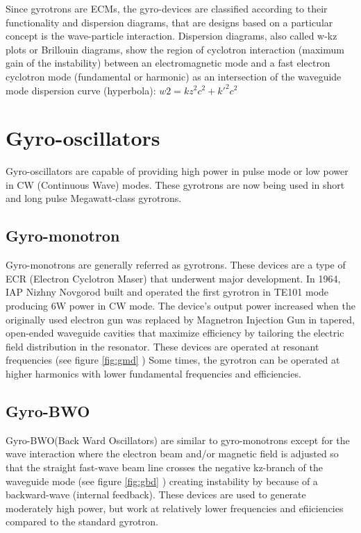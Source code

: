 Since gyrotrons are ECMs, the gyro-devices are classified according to their functionality and dispersion diagrams, that are designs based on a particular concept is the wave-particle interaction. Dispersion diagrams, also called w-kz plots or Brillouin diagrams, show the region of cyclotron interaction (maximum gain of the instability) between an electromagnetic mode and a fast electron cyclotron mode (fundamental or harmonic) as an intersection of the waveguide mode dispersion curve (hyperbola): $ w2 = k z^2 c^2 + k'^2 c^2 $

\section{Gyro-oscillators}
Gyro-oscillators are capable of providing high power in pulse mode or low power in CW (Continuous Wave) modes.  These gyrotrons are now being used in short and long pulse Megawatt-class gyrotrons.
\subsection{Gyro-monotron}
Gyro-monotrons are generally referred as gyrotrons. These devices are a type of ECR (Electron Cyclotron Maser) that underwent major development.  In 1964, IAP Nizhny Novgorod built and operated the first gyrotron in TE101 mode producing 6W power in CW mode. The device's output power increased when the originally used electron gun was replaced by Magnetron Injection Gun in tapered, open-ended waveguide cavities that maximize efficiency by tailoring the electric field distribution in the resonator. These devices are operated at resonant frequencies (see figure \ref{fig:gmd} ) Some times, the gyrotron can be operated at higher harmonics with lower fundamental frequencies and efficiencies.

\subsection{Gyro-BWO}
Gyro-BWO(Back Ward Oscillators) are similar to gyro-monotrons except for the wave interaction where the electron beam and/or magnetic field is adjusted so that the straight fast-wave beam line crosses the negative kz-branch of the waveguide mode (see figure \ref{fig:gbd} ) creating instability by because of a backward-wave (internal feedback). These devices are used to generate moderately high power, but work at relatively lower frequencies and efiiciencies compared to the standard gyrotron.\cite{ref:bwo}

